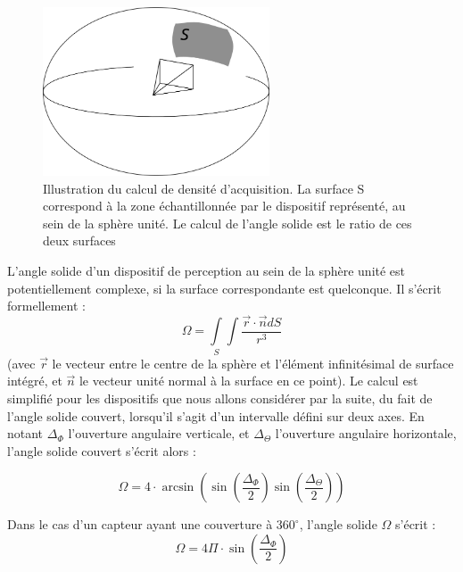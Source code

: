 \begin{figure}
	\begin{center}
		\includegraphics[width=0.6\textwidth]{Chapter3/graphics/calcul_density.png}
		\caption{Illustration du calcul de densité d'acquisition. La surface S correspond à la zone échantillonnée par le dispositif représenté, au sein de la sphère unité. Le calcul de l'angle solide est le ratio de ces deux surfaces}
		\label{fig:ch3_densité}
	\end{center}
\end{figure}

L'angle solide d'un dispositif de perception au sein de la sphère unité est potentiellement complexe, si la surface correspondante est quelconque. Il s'écrit formellement :
\begin{equation}
	\Omega = \int\limits_{S} \int \frac{ \vec{r} \cdot \vec{n} dS} {r^3}
\end{equation}
(avec $\vec{r}$ le vecteur entre le centre de la sphère et l'élément infinitésimal de surface intégré, et $\vec{n}$ le vecteur unité normal à la surface en ce point). Le calcul est simplifié pour les dispositifs que nous allons considérer par la suite, du fait de l'angle solide couvert, lorsqu'il s'agit d'un intervalle défini sur deux axes. En notant $\Delta_{\Phi}$ l'ouverture angulaire verticale, et $\Delta_{\Theta}$ l'ouverture angulaire horizontale, l'angle solide couvert s'écrit alors :

\begin{equation}
	\Omega = 4 \cdot \arcsin( \sin(\frac{\Delta_{\Phi}}{2}) \sin(\frac{\Delta_{\Theta}}{2}))
\end{equation}

Dans le cas d'un capteur ayant une couverture à $360^\circ$, l'angle solide $\Omega$ s'écrit :
\begin{equation}
	\Omega = 4 \Pi \cdot \sin(\frac{\Delta_{\Phi}}{2})
\end{equation}

